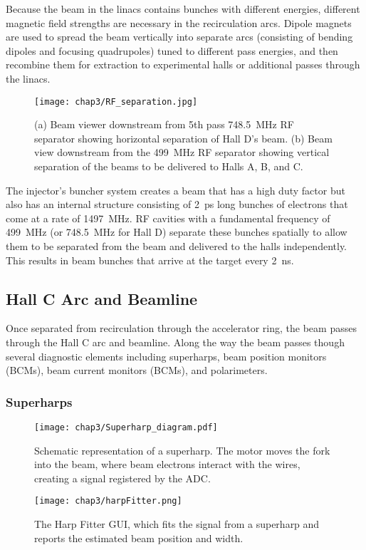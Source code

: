 Because the beam in the linacs contains bunches with different energies,
different magnetic field strengths are necessary in the recirculation arcs.
Dipole magnets are used to spread the beam vertically into separate arcs
(consisting of bending dipoles and focusing quadrupoles)
tuned to different pass energies, and then recombine them for extraction to
experimental halls or additional passes through the linacs.


\begin{figure}[!h]
    \centering
    \texttt{[image: chap3/RF\_separation.jpg]}
    \caption[Pictures of the beam viewer from two positions.]{(a) Beam viewer downstream from 5th pass \SI{748.5}{MHz} RF
             separator showing horizontal separation of Hall D's beam.
             (b) Beam view downstream from the \SI{499}{MHz} RF separator
             showing vertical separation of the beams to be delivered to Halls
             A, B, and C.
             }
    \label{fig:RF_separation}
\end{figure}


The injector's buncher system creates a beam that has a high duty factor but
also has an internal structure consisting of \SI{2}{ps} long bunches of
electrons that come at a rate of \SI{1497}{MHz}.
RF cavities with a fundamental frequency of \SI{499}{MHz} (or \SI{748.5}{MHz}
for Hall D) separate these bunches spatially to allow them to be separated from
the beam and delivered to the halls independently.
This results in beam bunches that arrive at the target every \SI{2}{ns}.

\subsection{Hall C Arc and Beamline}
Once separated from recirculation through the accelerator ring, the beam passes
through the Hall C arc and beamline.
Along the way the beam passes though several diagnostic elements including
superharps, beam position monitors (BCMs), beam current monitors (BCMs), and
polarimeters.


\subsubsection{Superharps}
\begin{figure}[!h]
    \centering
    \texttt{[image: chap3/Superharp\_diagram.pdf]}
    \caption[Schematic representation of a superharp.]{Schematic representation of a superharp. The motor moves the fork
             into the beam, where beam electrons interact with the wires,
             creating a signal registered by the ADC.}
    \label{fig:superharp_diagram}
\end{figure}
\begin{figure}[!h]
    \centering
    \texttt{[image: chap3/harpFitter.png]}
    \caption[The Harp Fitter GUI.]{The Harp Fitter GUI, which fits the signal from a superharp and
             reports the estimated beam position and width.
            }
    \label{fig:harp_fitter}
\end{figure}

